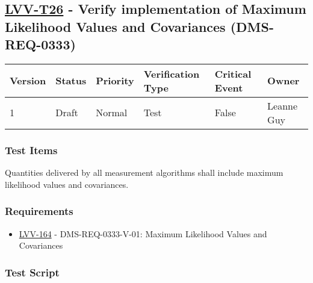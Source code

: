 \hypertarget{lvv-t26---verify-implementation-of-maximum-likelihood-values-and-covariances-dms-req-0333}{%
\subsection{\texorpdfstring{\href{https://jira.lsstcorp.org/secure/Tests.jspa\#/testCase/LVV-T26}{LVV-T26}
- Verify implementation of Maximum Likelihood Values and Covariances
(DMS-REQ-0333)}{LVV-T26 - Verify implementation of Maximum Likelihood Values and Covariances (DMS-REQ-0333)}}\label{lvv-t26---verify-implementation-of-maximum-likelihood-values-and-covariances-dms-req-0333}}

\begin{longtable}[]{@{}llllll@{}}
\toprule
Version & Status & Priority & Verification Type & Critical Event &
Owner\tabularnewline
\midrule
\endhead
1 & Draft & Normal & Test & False & Leanne Guy\tabularnewline
\bottomrule
\end{longtable}

\hypertarget{test-items-116}{%
\subsubsection{Test Items}\label{test-items-116}}

Quantities delivered by all measurement algorithms shall include maximum
likelihood values and covariances.

\hypertarget{requirements-116}{%
\subsubsection{Requirements}\label{requirements-116}}

\begin{itemize}
\tightlist
\item
  \href{https://jira.lsstcorp.org/browse/LVV-164}{LVV-164} -
  DMS-REQ-0333-V-01: Maximum Likelihood Values and Covariances
\end{itemize}

\hypertarget{test-script-116}{%
\subsubsection{Test Script}\label{test-script-116}}

